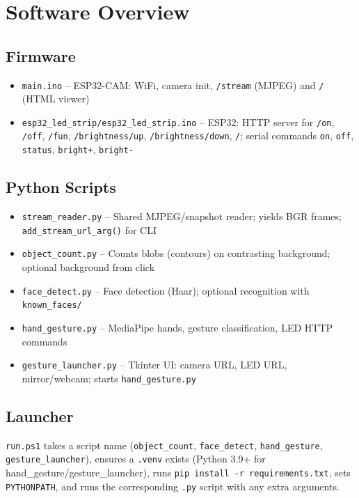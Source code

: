 \documentclass[a4paper,12pt]{article}
\begin{document}
\section{Software Overview}

\subsection{Firmware}
\begin{itemize}
    \item \texttt{main.ino} -- ESP32-CAM: WiFi, camera init, \texttt{/stream} (MJPEG) and \texttt{/} (HTML viewer)
    \item \texttt{esp32\_led\_strip/esp32\_led\_strip.ino} -- ESP32: HTTP server for \texttt{/on}, \texttt{/off}, \texttt{/fun}, \texttt{/brightness/up}, \texttt{/brightness/down}, \texttt{/}; serial commands \texttt{on}, \texttt{off}, \texttt{status}, \texttt{bright+}, \texttt{bright-}
\end{itemize}

\subsection{Python Scripts}
\begin{itemize}
    \item \texttt{stream\_reader.py} -- Shared MJPEG/snapshot reader; yields BGR frames; \texttt{add\_stream\_url\_arg()} for CLI
    \item \texttt{object\_count.py} -- Counts blobs (contours) on contrasting background; optional background from click
    \item \texttt{face\_detect.py} -- Face detection (Haar); optional recognition with \texttt{known\_faces/}
    \item \texttt{hand\_gesture.py} -- MediaPipe hands, gesture classification, LED HTTP commands
    \item \texttt{gesture\_launcher.py} -- Tkinter UI: camera URL, LED URL, mirror/webcam; starts \texttt{hand\_gesture.py}
\end{itemize}

\subsection{Launcher}
\texttt{run.ps1} takes a script name (\texttt{object\_count}, \texttt{face\_detect}, \texttt{hand\_gesture}, \texttt{gesture\_launcher}), ensures a \texttt{.venv} exists (Python 3.9+ for hand\_gesture/gesture\_launcher), runs \texttt{pip install -r requirements.txt}, sets \texttt{PYTHONPATH}, and runs the corresponding \texttt{.py} script with any extra arguments.
\end{document}
